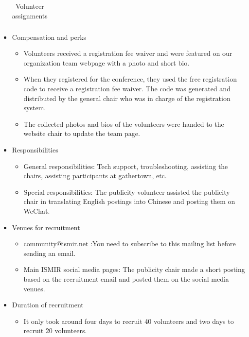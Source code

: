 \documentclass[%
10pt,								%
]
{scrartcl}
\begin{document}
\begin{itemize}
\begin{table}
\begin{tabular}{l|l|l|l|l}
                    \end{tabular}
                    \caption{Volunteer assignments}
                    \label{tab:volunteers}
                \end{table}
            \item   Compensation and perks
                \begin{itemize}
                    \item   Volunteers received a registration fee waiver and were featured on our organization team webpage with a photo and short bio.
                    \item   When they registered for the conference, they used the free registration code to receive a registration fee waiver. The code was generated and distributed by the general chair who was in charge of the registration system.
                    \item   The collected photos and bios of the volunteers were handed to the website chair to update the team page. 
                \end{itemize}
            \item   Responsibilities
                \begin{itemize}
                    \item   General responsibilities: Tech support, troubleshooting, assisting the chairs, assisting participants at gathertown, etc. 
                    \item   Special responsibilities: The publicity volunteer assisted the publicity chair in translating English postings into Chinese and posting them on WeChat.
                \end{itemize}
            \item   Venues for recruitment
                \begin{itemize}
                    \item   community@ismir.net :You need to subscribe to this mailing list before sending an email.
                    \item   Main ISMIR social media pages: The publicity chair made a short posting based on the recruitment email and posted them on the social media venues. 
                \end{itemize}
            \item   Duration of recruitment
                \begin{itemize}
                    \item   It only took around four days to recruit 40 volunteers and two days to recruit 20 volunteers.

\end{itemize}
\end{itemize}
\end{document}
